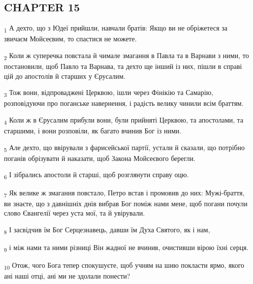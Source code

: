 \subsection{CHAPTER 15}
\begin{tcolorbox}
\textsubscript{1} А дехто, що з Юдеї прийшли, навчали братів: Якщо ви не обріжетеся за звичаєм Мойсеєвим, то спастися не можете.
\end{tcolorbox}
\begin{tcolorbox}
\textsubscript{2} Коли ж суперечка повстала й чимале змагання в Павла та в Варнави з ними, то постановили, щоб Павло та Варнава, та дехто ще інший із них, пішли в справі цій до апостолів й старших у Єрусалим.
\end{tcolorbox}
\begin{tcolorbox}
\textsubscript{3} Тож вони, відпроваджені Церквою, ішли через Фінікію та Самарію, розповідуючи про поганське навернення, і радість велику чинили всім браттям.
\end{tcolorbox}
\begin{tcolorbox}
\textsubscript{4} Коли ж в Єрусалим прибули вони, були прийняті Церквою, та апостолами, та старшими, і вони розповіли, як багато вчинив Бог із ними.
\end{tcolorbox}
\begin{tcolorbox}
\textsubscript{5} Але дехто, що ввірували з фарисейської партії, устали й сказали, що потрібно поганів обрізувати й наказати, щоб Закона Мойсеєвого берегли.
\end{tcolorbox}
\begin{tcolorbox}
\textsubscript{6} І зібрались апостоли й старші, щоб розглянути справу оцю.
\end{tcolorbox}
\begin{tcolorbox}
\textsubscript{7} Як велике ж змагання повстало, Петро встав і промовив до них: Мужі-браття, ви знаєте, що з давнішніх днів вибрав Бог поміж нами мене, щоб погани почули слово Євангелії через уста мої, та й увірували.
\end{tcolorbox}
\begin{tcolorbox}
\textsubscript{8} І засвідчив їм Бог Серцезнавець, давши їм Духа Святого, як і нам,
\end{tcolorbox}
\begin{tcolorbox}
\textsubscript{9} і між нами та ними різниці Він жадної не вчинив, очистивши вірою їхні серця.
\end{tcolorbox}
\begin{tcolorbox}
\textsubscript{10} Отож, чого Бога тепер спокушуєте, щоб учням на шию покласти ярмо, якого ані наші отці, ані ми не здолали понести?
\end{tcolorbox}
